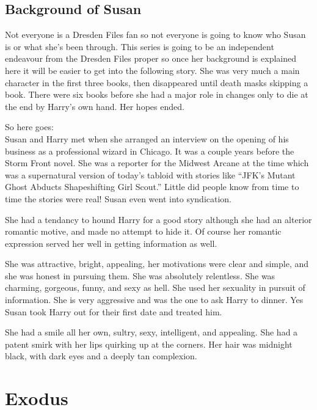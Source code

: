 \documentclass[12pt,twoside,onecolumn,openright,extrafontsizes]{memoir}
\begin{document}
\chapter*{Background of Susan}
{Not everyone is a Dresden Files fan so not everyone is going to know who Susan is or what she's been through. This series is going to be an independent endeavour from the Dresden Files proper so once her background is explained here it will be easier to get into the following story. She was very much a main character in the first three books, then disappeared until death masks skipping a book. There were six books before she had a major role in changes only to die at the end by Harry's own hand. Her hopes ended.

So here goes:\\
	\smallskip
Susan and Harry met when she arranged an interview on the opening of his business as a professional wizard in Chicago. It was a couple years before the Storm Front novel. She was a reporter for the Midwest Arcane at the time which was a supernatural version of today's tabloid with stories like ``JFK’s Mutant Ghost Abducts Shapeshifting Girl Scout.'' Little did people know from time to time the stories were real! Susan even went into syndication.

She had a tendancy to hound Harry for a good story although she had an alterior romantic motive, and made no attempt to hide it. Of course her romantic expression served her well in getting information as well.

She was attractive, bright, appealing, her motivations were clear and simple, and she was honest in pursuing them. She was absolutely relentless. She was charming, gorgeous, funny, and sexy as hell. She used her sexuality in pursuit of information. She is very aggressive and was the one to ask Harry to dinner. Yes Susan took Harry out for their first date and treated him. 

She had a smile all her own, sultry, sexy, intelligent, and appealing. She had a patent smirk with her lips quirking up at the corners. Her hair was midnight black, with dark eyes and a deeply tan complexion.




	
}
		
\clearpage
\tableofcontents*

\mainmatter
\part{Exodus}
\end{document}
